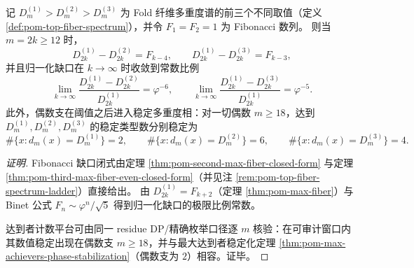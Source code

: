 \begin{conclusion}\label{con:xi-terminal-top3-fiber-spectrum-stable-multiplicity-phase}
记 \(D_m^{(1)}>\!D_m^{(2)}>\!D_m^{(3)}\) 为 Fold 纤维多重度谱的前三个不同取值（定义 \ref{def:pom-top-fiber-spectrum}），并令 \(F_1=F_2=1\) 为 Fibonacci 数列。
则当 \(m=2k\ge 12\) 时，
\[
D_{2k}^{(1)}-D_{2k}^{(2)}=F_{k-4},
\qquad
D_{2k}^{(1)}-D_{2k}^{(3)}=F_{k-3},
\]
并且归一化缺口在 \(k\to\infty\) 时收敛到常数比例
\[
\lim_{k\to\infty}\frac{D_{2k}^{(1)}-D_{2k}^{(2)}}{D_{2k}^{(1)}}=\varphi^{-6},
\qquad
\lim_{k\to\infty}\frac{D_{2k}^{(1)}-D_{2k}^{(3)}}{D_{2k}^{(1)}}=\varphi^{-5}.
\]
此外，偶数支在阈值之后进入稳定多重度相：对一切偶数 \(m\ge 18\)，达到 \(D_m^{(1)},D_m^{(2)},D_m^{(3)}\) 的稳定类型数分别稳定为
\[
\#\{x:d_m(x)=D_m^{(1)}\}=2,\qquad
\#\{x:d_m(x)=D_m^{(2)}\}=6,\qquad
\#\{x:d_m(x)=D_m^{(3)}\}=4.
\]
\end{conclusion}
\begin{proof}[证明]
Fibonacci 缺口闭式由定理 \ref{thm:pom-second-max-fiber-closed-form} 与定理 \ref{thm:pom-third-max-fiber-even-closed-form}（并见注 \ref{rem:pom-top-fiber-spectrum-ladder}）直接给出。
由 \(D_{2k}^{(1)}=F_{k+2}\)（定理 \ref{thm:pom-max-fiber}）与 Binet 公式 \(F_n\sim \varphi^n/\sqrt5\) 得到归一化缺口的极限比例常数。
\par
达到者计数平台可由同一 residue DP/精确枚举口径逐 \(m\) 核验：在可审计窗口内其数值稳定出现在偶数支 \(m\ge 18\)，并与最大达到者稳定化定理 \ref{thm:pom-max-achievers-phase-stabilization}（偶数支为 \(2\)）相容。证毕。
\end{proof}

